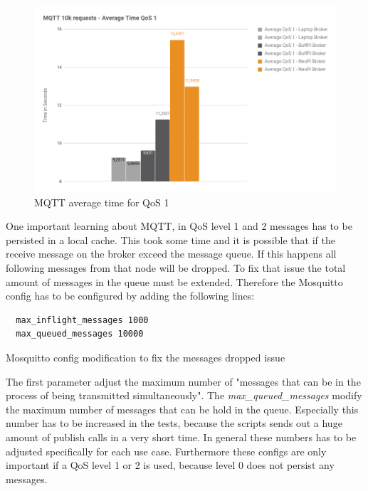 \begin{figure}[H]
    \centering
    \includegraphics[width=\textwidth]{resources/images/performance_mqtt_average_time_qos_1.png}
    \caption[MQTT average time for QoS 1]{MQTT average time for QoS 1}
    \label{fig:performance_mqtt_average_time_qos_1}
\end{figure}

One important learning about MQTT, in \ac{QoS} level 1 and 2 messages has to be persisted in a local cache.
This took some time and it is possible that if the receive message on the broker exceed the message queue.
If this happens all following messages from that node will be dropped.
To fix that issue the total amount of messages in the queue must be extended.
Therefore the Mosquitto config has to be configured by adding the following lines:

\begin{listing}[H]
  \begin{verbatim}
  max_inflight_messages 1000
  max_queued_messages 10000
  \end{verbatim}
  \caption[Mosquitto config modification to fix the messages dropped issue]{Mosquitto config modification to fix the messages dropped issue}
  \label{code:performance_mosquitto_config}
\end{listing}

The first parameter adjust the maximum number of "messages that can be in the process of being transmitted simultaneously"\autocite{Mosquitto:Conf:Documentation}.
The \textit{max\_queued\_messages} modify the maximum number of messages that can be hold in the queue.\autocite[cf.]{Mosquitto:Conf:Documentation}
Especially this number has to be increased in the tests, because the scripts sends out a huge amount of publish calls in a very short time.
In general these numbers has to be adjusted specifically for each use case.
Furthermore these configs are only important if a \ac{QoS} level 1 or 2 is used, because level 0 does not persist any messages.


